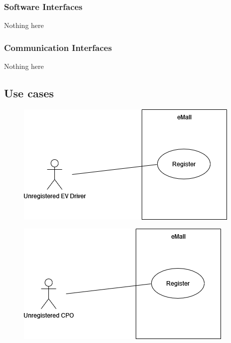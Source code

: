 \subsubsection{Software Interfaces}
Nothing here

\subsubsection{Communication Interfaces}
Nothing here

\subsection{Use cases}

\begin{figure}[H]
    \centering
    \includegraphics[scale=0.6]{src/use_case_diagram/driver_registration.png}
\end{figure}

\begin{figure}[H]
    \centering
    \includegraphics[scale=0.6]{src/use_case_diagram/cpo_registration.png}
\end{figure}

